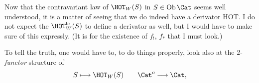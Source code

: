 Now that the contravariant law of $\HOT_W(S)$ in $S \in \mathrm{Ob}\,\Cat$ seems well understood, it is a matter of seeing that we do indeed have a derivator HOT. I do not expect the $\HOT_W^{\mathrm{lc}}(S)$
to define a derivator as well, but I would have to make sure of this expressly. (It is for the existence of $f_!$, $f_*$ that I must look.) %

To tell the truth, one would have to, to do things properly, look also at the 2-\textit{functor} structure of
\[
S \longmapsto \HOT_W(S) \qquad \Cat^o \longrightarrow \Cat,
\]